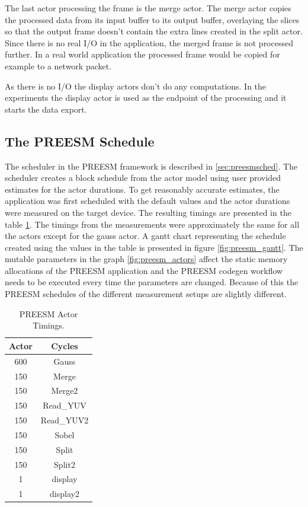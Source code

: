 The last actor processing the frame is the merge actor. The merge actor copies
the processed data from its input buffer to its output buffer, overlaying the
slices so that the output frame doesn't contain the extra lines created in the
split actor. Since there is no real I/O in the application, the merged frame is
not processed further. In a real world application the processed frame would be
copied for example to a network packet.

As there is no I/O the display actors don't do any computations. In the
experiments the display actor is used as the endpoint of the processing and it
starts the data export.

\subsection{The PREESM Schedule}
\label{subsec:preesmsched}

The scheduler in the PREESM framework is described in \ref{sec:preesmsched}.
The scheduler creates a block schedule from the actor model using user provided
estimates for the actor durations. To get reasonably accurate estimates, the
application was first scheduled with the default values and the actor durations
were measured on the target device. The resulting timings are presented in the
table \ref{tab:preesm_times}. The timings from the measurements were approximately
the same for all the actors except for the gauss actor. A gantt
chart representing the schedule created using the values in the table is
presented in figure \ref{fig:preesm_gantt}. The mutable parameters in the graph
\ref{fig:preesm_actors} affect the static memory allocations of the PREESM
application and the PREESM codegen workflow needs to be executed every time the
parameters are changed. Because of this the PREESM schedules of the different
measurement setups are slightly different.

\begin{table}
    \label{tab:preesm_times}
    \begin{center}
        \begin{tabular}{| c | c |}

            \hline
            Actor & Cycles \\ \hline
            600 & Gauss \\ \hline
            150 & Merge \\ \hline
            150 & Merge2 \\ \hline
            150 & Read\_YUV \\ \hline
            150 & Read\_YUV2 \\ \hline
            150 & Sobel \\ \hline
            150 & Split \\ \hline
            150 & Split2 \\ \hline
            1 & display \\ \hline
            1 & display2 \\ \hline
        \end{tabular}
        \caption{PREESM Actor Timings.}
    \end{center}
\end{table}

